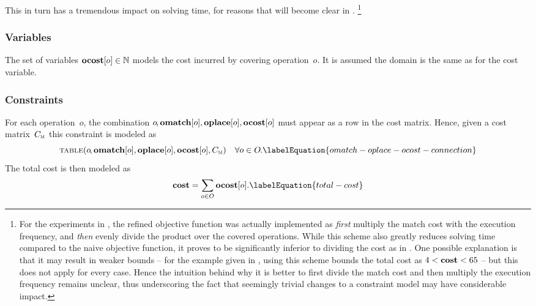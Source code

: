%
This in turn has a tremendous impact on solving time, for reasons that will
become clear in .\!%
%
\footnote{%
  For the experiments in \cite{HjortBlindellEtAl:2017:CASES}, the refined
  \gls{objective function} was actually implemented as \emph{first} multiply the
  \gls{match} cost with the execution frequency, and \emph{then} evenly divide
  the product over the covered \glspl{operation}.
  While this scheme also greatly reduces solving time compared to the naive
  \gls{objective function}, it proves to be significantly inferior to dividing
  the cost as in .
  One possible explanation is that it may result in weaker bounds -- for the
  example given in , using this scheme bounds the total
  cost as \mbox{$4 < \mVar{cost} < 65$} -- but this does not apply for every
  case.
  Hence the intuition behind why it is better to first divide the \gls{match}
  cost and then multiply the execution frequency remains unclear, thus
  underscoring the fact that seemingly trivial changes to a \gls{constraint
    model} may have considerable impact.%
}


\subsubsection{Variables}

The set of \glspl{variable} \mbox{$\mVar{ocost}[o] \in \mNatNumSet$} models the
cost incurred by covering operation~$o$\hspace{-.8pt}.
%
It is assumed the \gls{domain} is the same as for the \gls{cost variable}.


\subsubsection{Constraints}

For each \gls{operation}~$o$\hspace{-.8pt}, the combination
\mbox{$o\hspace{-.8pt}, \mVar{omatch}[o], \mVar{oplace}[o], \mVar{ocost}[o]$}
must appear as a row in the cost matrix.
%
Hence, given a cost matrix~$C_{\textsc{m}}$ this \gls{constraint} is modeled as
%
\begin{equation}
  \mTable(
    o\hspace{-1pt},
    \mVar{omatch}[o],
    \mVar{oplace}[o],
    \mVar{ocost}[o],
    \mCostMatrix
  )
  \mQuantSep
  \forall o \in \mOpSet \hspace{-.8pt}.
  \labelEquation{omatch-oplace-ocost-connection}
\end{equation}
%
The total cost is then modeled as
%
\begin{equation}
  \mVar{cost} = \sum_{o \in \mOpSet} \mVar{ocost}[o].
  \labelEquation{total-cost}
\end{equation}



